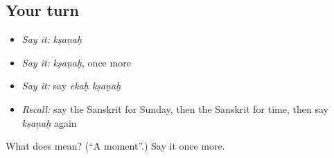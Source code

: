 \subsection*{Your turn}
\begin{itemize}
\raggedright
  \item \emph{Say it:} \emph{kṣaṇaḥ}
  \item \emph{Say it:} \emph{kṣaṇaḥ}, once more
  \item \emph{Say it:} say \emph{ekaḥ kṣaṇaḥ}
  \item \emph{Recall:} say the Sanskrit for Sunday, then the Sanskrit for time, then say \emph{kṣaṇaḥ} again
\end{itemize}

\begin{tcolorbox}[breakable,colback=teal!4,colframe=teal!35!black,title={Before you move on}]
What does  mean? (\textquotedblleft{}A moment\textquotedblright{}.) Say it once more.
\end{tcolorbox}
